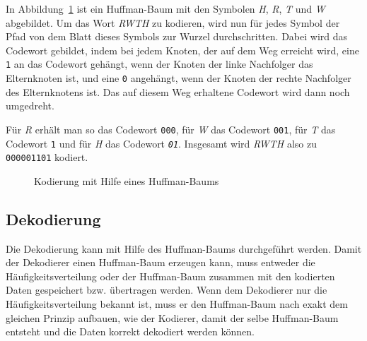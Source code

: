 \documentclass[twoside,11pt,a4paper]{article}
\theoremstyle{break}
\begin{document}
In Abbildung~\ref{fig:HKOD} ist ein Huffman-Baum mit den Symbolen
\emph{H}, \emph{R}, \emph{T} und \emph{W} abgebildet. Um das Wort
\emph{RWTH} zu kodieren, wird nun für jedes Symbol der Pfad von dem
Blatt dieses Symbols zur Wurzel durchschritten. Dabei wird das
Codewort gebildet, indem bei jedem Knoten, der auf dem Weg erreicht
wird, eine {\tt1} an das Codewort gehängt, wenn der Knoten der linke
Nachfolger das Elternknoten ist, und eine {\tt0} angehängt, wenn der
Knoten der rechte Nachfolger des Elternknotens ist. Das auf diesem
Weg erhaltene Codewort wird dann noch umgedreht.

Für \emph{R} erhält man so das Codewort {\tt000}, für \emph{W} das
Codewort {\tt001}, für \emph{T} das Codewort {\tt1} und für \emph{H}
das Codewort \emph{\tt01}. Insgesamt wird \emph{RWTH} also zu
{\tt000001101} kodiert.

\begin{figure}[h]
\centering
{}
\caption{Kodierung mit Hilfe eines Huffman-Baums} \label{fig:HKOD}
\end{figure}

\subsection{Dekodierung} \label{sec:huffman-dec}
Die Dekodierung kann mit Hilfe des Huffman-Baums durchgeführt
werden. Damit der Dekodierer einen Huffman-Baum erzeugen kann, muss
entweder die Häufigkeitsverteilung oder der Huffman-Baum zusammen mit
den kodierten Daten gespeichert bzw. übertragen werden. Wenn dem
Dekodierer nur die Häufigkeitsverteilung bekannt ist, muss er den
Huffman-Baum nach exakt dem gleichen Prinzip aufbauen, wie der
Kodierer, damit der selbe Huffman-Baum entsteht und die Daten korrekt
dekodiert werden können.
\end{document}
